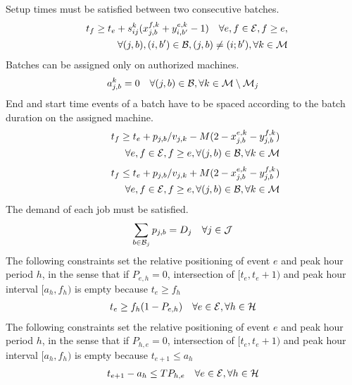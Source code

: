 Setup times must be satisfied between two consecutive batches.
\begin{eqnarray}
t_f\geq t_e + s_{ij}^k ( x_{j,b}^{f,k}+y_{i,b'}^{e,k}-1 ) \quad
\forall e,f\in{\cal E}, f\geq e,\nonumber\\ \quad \quad \quad
\quad\forall (j,b),(i,b')\in{\cal B},(j,b)\neq(i;b'), \forall
k\in{\cal M}
\end{eqnarray}
Batches can be assigned only on authorized machines.
\begin{eqnarray}
a_{j,b}^k=0\quad\forall(j,b)\in{\cal B},\forall k\in{\cal
  M}\setminus{\cal M}_j
\end{eqnarray}
End and start time events of a batch have to be spaced according to
the batch duration on the assigned machine.
\begin{eqnarray}
t_f\geq t_e+p_{j,b}/v_{j,k}-M
(2-x_{j,b}^{e,k}-y_{j,b}^{f,k})\nonumber\\ \quad \quad \quad
\quad\forall e,f\in{\cal E}, f\geq e,\forall (j,b)\in{\cal B},\forall
k\in{\cal M}
\end{eqnarray}
\begin{eqnarray}
t_f\leq t_e+p_{j,b}/v_{j,k}+M
(2-x_{j,b}^{e,k}-y_{j,b}^{f,k})\nonumber\\ \quad \quad \quad
\quad\forall e,f\in{\cal E}, f\geq e,\forall (j,b)\in{\cal B},\forall
k\in{\cal M}
\end{eqnarray}
The demand of each job must be satisfied.
\begin{eqnarray}
\sum_{b\in{\cal B}_j} p_{j,b}=D_j\quad\forall j\in{\cal J}
\end{eqnarray}
The following constraints set the relative positioning of event $e$
and peak hour period $h$, in the sense that if $P_{e,h}=0$,
intersection of $[t_e,t_e+1)$ and peak hour interval $[a_h,f_h)$ is
    empty because $t_e\geq f_h$
\begin{eqnarray}
t_e\geq f_h(1-P_{e,h})\quad\forall e\in{\cal E},\forall h\in{\cal H}
\end{eqnarray}
The following constraints set the relative positioning of event $e$
and peak hour period $h$, in the sense that if $P_{h,e}=0$,
intersection of $[t_e,t_e+1)$ and peak hour interval $[a_h,f_h)$ is
    empty because $t_{e+1}\leq a_h$
\begin{eqnarray}
t_{e+1}-a_h \leq T P_{h,e}\quad\forall e\in{\cal E},\forall h\in{\cal
  H}
\end{eqnarray}



